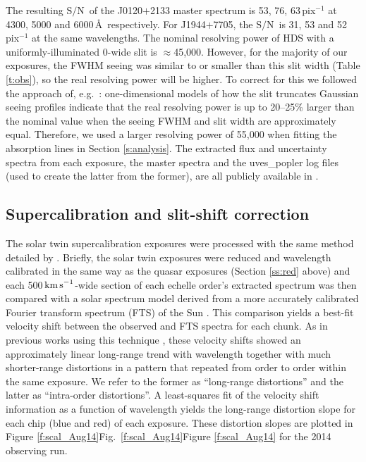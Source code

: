 \documentclass[fleqn,usenatbib,usedcolumn]{mnras}
\newcommand{\Sref}[1]{Section \ref{#1}}
\newcommand{\Tref}[1]{Table \ref{#1}}
\newcommand{\Fref}[1]{\ifhmode \ifnum\spacefactor=1001 Figure \ref{#1}\else Fig.\ \ref{#1}\fi \else Figure \ref{#1}\fi}
\newcommand{\kms}{\ensuremath{\textrm{km\,s}^{-1}}}
\newcommand{\SN}{\ensuremath{\textrm{S/N}}}
\begin{document}
The resulting \SN\ of the J0120$+$2133 master spectrum is 53, 76, 63\,pix$^{-1}$ at 4300, 5000 and 6000\,\AA\ respectively. For J1944$+$7705, the \SN\ is 31, 53 and 52\,pix$^{-1}$ at the same wavelengths. The nominal resolving power of HDS with a uniformly-illuminated 0-wide slit is $\approx$45,000. However, for the majority of our exposures, the FWHM seeing was similar to or smaller than this slit width (\Tref{t:obs}), so the real resolving power will be higher. To correct for this we followed the approach of, e.g.\ \citet{Kotus:2017:3679}: one-dimensional models of how the slit truncates Gaussian seeing profiles indicate that the real resolving power is up to 20--25\% larger than the nominal value when the seeing FWHM and slit width are approximately equal. Therefore, we used a larger resolving power of 55,000 when fitting the absorption lines in \Sref{s:analysis}. The extracted flux and uncertainty spectra from each exposure, the master spectra and the {\sc uves\_popler} log files (used to create the latter from the former), are all publicly available in \citet{Murphy:2017:alphaSubaru}.


\subsection{Supercalibration and slit-shift correction}\label{ss:scal}

The solar twin supercalibration exposures were processed with the same method detailed by \citet{Whitmore:2015:446}. Briefly, the solar twin exposures were reduced and wavelength calibrated in the same way as the quasar exposures (\Sref{ss:red} above) and each 500\,\kms-wide section of each echelle order's extracted spectrum was then compared with a solar spectrum model derived from a more accurately calibrated Fourier transform spectrum (FTS) of the Sun \citep[``KPNO2010'' from][]{Chance:2010:1289}. This comparison yields a best-fit velocity shift between the observed and FTS spectra for each chunk. As in previous works using this technique \citep[e.g.][]{Whitmore:2015:446,Dapra:2016:192,Dapra:2017:3848}, these velocity shifts showed an approximately linear long-range trend with wavelength together with much shorter-range distortions in a pattern that repeated from order to order within the same exposure. We refer to the former as ``long-range distortions'' and the latter as ``intra-order distortions''. A least-squares fit of the velocity shift information as a function of wavelength yields the long-range distortion slope for each chip (blue and red) of each exposure. These distortion slopes are plotted in \Fref{f:scal_Aug14} for the 2014 observing run.
\end{document}
